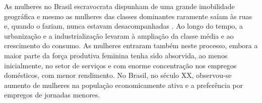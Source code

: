 


As mulheres no Brasil escravocrata dispunham de uma grande imobilidade geográfica e mesmo as mulheres das classes dominantes raramente saíam às ruas e, quando o faziam, nunca estavam desacompanhadas \cite{SAFIOTTI1976}.
Ao longo do tempo, a urbanização e a industrialização levaram à ampliação da classe média e ao crescimento do consumo. As mulheres entraram também neste processo, embora a maior parte da força produtiva feminina tenha sido absorvida, ao menos inicialmente, no setor de serviços e com enorme
concentração nos empregos domésticos, com menor rendimento.
No Brasil, no século XX, observou-se aumento de mulheres na população economicamente ativa e a preferência por empregos de jornadas
menores.

